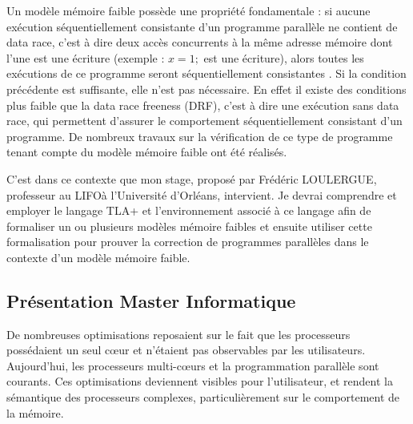 \documentclass[12pt,a4paper]{article}
\begin{document}
Un modèle mémoire faible possède une propriété fondamentale : si aucune exécution séquentiellement consistante d'un programme parallèle ne contient de data race, c'est à dire deux accès concurrents à la même adresse mémoire dont l'une est une écriture (exemple : $x = 1;$ est une écriture), alors toutes les exécutions de ce programme seront séquentiellement consistantes \cite{Saraswat:2007:TMM:1229428.1229469}.
Si la condition précédente est suffisante, elle n'est pas nécessaire. En effet il existe des conditions plus faible que la data race freeness (DRF), c'est à dire une exécution sans data race, qui permettent d'assurer le comportement séquentiellement consistant d'un programme\cite{Owens:2010:RIC:1883978.1884011}. De nombreux travaux sur la vérification de ce type de programme tenant compte du modèle mémoire faible ont été réalisés\cite{Turon:2014:GNW:2714064.2660243}.

C'est dans ce contexte que mon stage, proposé par Frédéric LOULERGUE, professeur au LIFO\footnotemark[1] à l'Université d'Orléans, intervient. Je devrai comprendre et employer le langage TLA+ \cite{Lamport:2002:SST:579617} et l'environnement associé à ce langage afin de formaliser un ou plusieurs modèles mémoire faibles et ensuite utiliser cette formalisation pour prouver la correction de programmes parallèles dans le contexte d'un modèle mémoire faible. 
  
\subsection{Présentation Master Informatique}

De nombreuses optimisations reposaient sur le fait que les processeurs possédaient un seul cœur et n'étaient pas observables par les utilisateurs.
Aujourd'hui, les processeurs multi-cœurs et la programmation parallèle sont courants. Ces optimisations deviennent visibles pour l'utilisateur, et rendent la sémantique des processeurs complexes, particulièrement sur le comportement de la mémoire.
\end{document}
